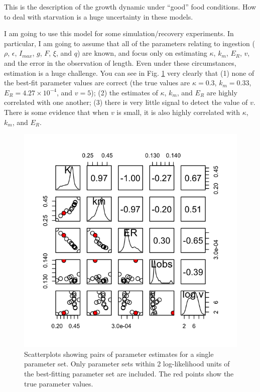 \documentclass[12pt,reqno,final,pdftex]{amsart}\usepackage[]{graphicx}\usepackage[]{color}
\newenvironment{knitrout}{}{} %
\theoremstyle{plain}
\numberwithin{equation}{part}
\begin{document}
This is the description of the growth dynamic under ``good'' food conditions.
How to deal with starvation is a huge uncertainty in these models.

I am going to use this model for some simulation/recovery experiments.
In particular, I am going to assume that all of the parameters relating to ingestion ($\rho$, $\epsilon$, $I_{max}$, $g$, $F$, $\xi$, and $q$) are known, and focus only on estimating $\kappa$, $k_m$, $E_R$, $v$, and the error in the observation of length.
Even under these circumstances, estimation is a huge challenge.
You can see in Fig. \ref{fig:growth-reprod-1} very clearly that (1) none of the best-fit parameter values are correct (the true values are $\kappa=0.3$, $k_m=0.33$, $E_R=4.27\times10^{-4}$, and $v=5$); (2) the estimates of $\kappa$, $k_m$, and $E_R$ are highly correlated with one another; (3) there is very little signal to detect the value of $v$.
There is some evidence that when $v$ is small, it is also highly correlated with $\kappa$, $k_m$, and $E_R$.

\begin{knitrout}\scriptsize
{}\color{fgcolor}\begin{figure}

\includegraphics[width=\linewidth]{figure/growth-reprod-1-1} \hfill{}

\caption[Scatterplots showing pairs of parameter estimates for a single parameter set]{Scatterplots showing pairs of parameter estimates for a single parameter set. Only parameter sets within 2 log-likelihood units of the best-fitting parameter set are included. The red points show the true parameter values.}\label{fig:growth-reprod-1}
\end{figure}


\end{knitrout}
\end{document}
